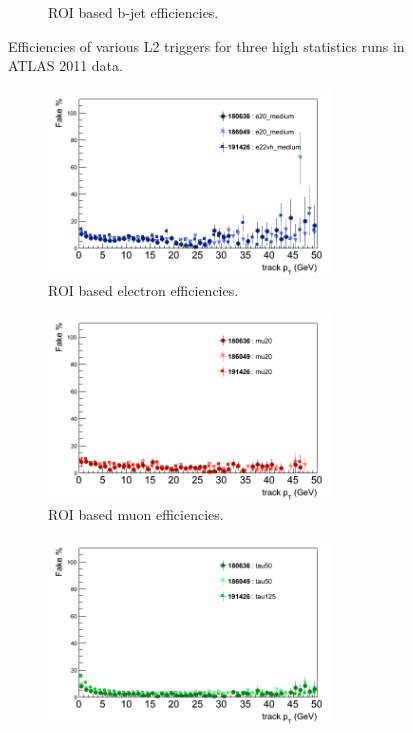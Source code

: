 \begin{figure}[htbp]
\begin{subfigure}{.5\linewidth}
		\caption{ROI based b-jet efficiencies.}
		\label{fig:trig_2011_L2_pt_g}
	\end{subfigure}
	\caption{Efficiencies of various L2 triggers for three high statistics runs in ATLAS 2011 data.}
	\label{fig:trig_2011_L2_pt}
\end{figure}

\clearpage

\begin{figure}[htbp]
	\begin{subfigure}{.5\linewidth}
		\centering
		\includegraphics[width=75mm]{f/e20_medium_IDTrkNoCut_pT_EF_fake}
		\caption{ROI based electron efficiencies.}
		\label{fig:trig_2011_EF_pt_a}
	\end{subfigure}
	\begin{subfigure}{.5\linewidth}	
		\centering
		\includegraphics[width=75mm]{f/mu20_IDTrkNoCut_pT_EF_fake}
		\caption{ROI based muon efficiencies.}
		\label{fig:trig_2011_EF_pt_c}
	\end{subfigure}
	\begin{subfigure}{.5\linewidth}	
		\centering
		\includegraphics[width=75mm]{f/tau50_IDTrkNoCut_pT_EF_fake}

\end{subfigure}
\end{figure}
